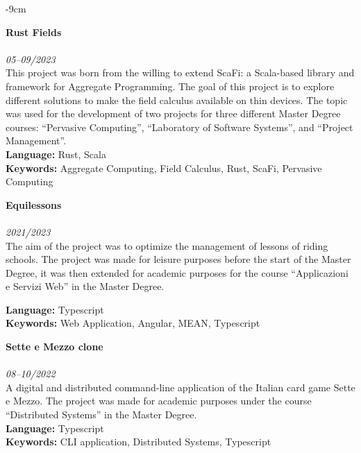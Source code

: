 \documentclass[10pt,a4paper]{altacv}
\begin{document}
\begin{adjustwidth}{}{-9cm}
    \divider

    \textbf{Rust Fields}\\
    \\
    \textit{05--09/2023}\\ \smallskip
    This project was born from the willing to extend ScaFi: a Scala-based library and framework for Aggregate Programming.
    The goal of this project is to explore different solutions to make the field calculus available on thin devices.
    The topic was used for the development of two projects for three different Master Degree courses: ``Pervasive Computing'',
    ``Laboratory of Software Systems'', and ``Project Management''.\\ \smallskip
    \textbf{Language:} Rust, Scala\\
    \textbf{Keywords:} Aggregate Computing, Field Calculus, Rust, ScaFi, Pervasive Computing

    \divider

    \textbf{Equilessons}\\
    \\
    \textit{2021/2023}\\ \smallskip
    The aim of the project was to optimize the management of lessons of riding schools.
    The project was made for leisure purposes before the start of the Master Degree, it was then extended for academic purposes for the course ``Applicazioni e Servizi Web'' in the Master Degree.\\ \smallskip
    \smallskip

    \textbf{Language:} Typescript\\
    \textbf{Keywords:} Web Application, Angular, MEAN, Typescript

    \divider

    \textbf{Sette e Mezzo clone}\\
    \\
    \textit{08--10/2022}\\ \smallskip
    A digital and distributed command-line application of the Italian card game Sette e Mezzo. The project was made for academic purposes under the course ``Distributed Systems'' in the Master Degree.\\ \smallskip
    \textbf{Language:} Typescript\\
    \textbf{Keywords:} CLI application, Distributed Systems, Typescript


\end{adjustwidth}
\end{document}
